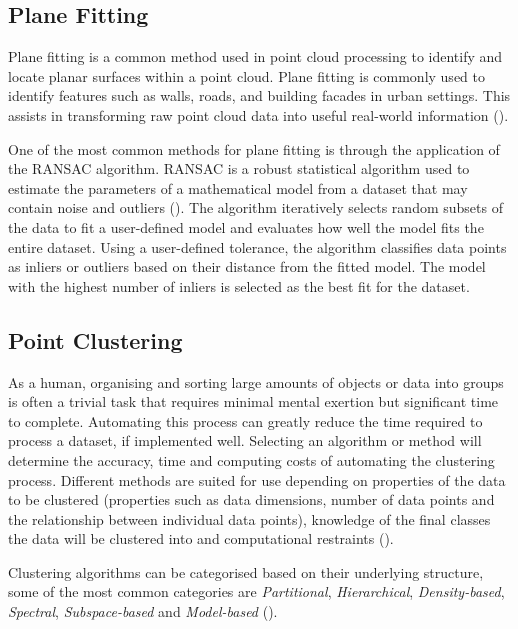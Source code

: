 \subsection{Plane Fitting}
\label{subsec:ch3.section3.subsec1}

Plane fitting is a common method used in point cloud processing to identify and locate planar surfaces within a point cloud. Plane fitting is commonly used to identify features such as walls, roads, and building facades in urban settings. This assists in transforming raw point cloud data into useful real-world information (\cite{lohaniAirborneLiDARTechnology2017}).

One of the most common methods for plane fitting is through the application of the \ac{RANSAC} algorithm. \ac{RANSAC} is a robust statistical algorithm used to estimate the parameters of a mathematical model from a dataset that may contain noise and outliers (\cite{fischlerRandomSampleConsensus1981}). The algorithm iteratively selects random subsets of the data to fit a user-defined model and evaluates how well the model fits the entire dataset. Using a user-defined tolerance, the algorithm classifies data points as inliers or outliers based on their distance from the fitted model. The model with the highest number of inliers is selected as the best fit for the dataset.

\subsection{Point Clustering}
\label{subsec:ch3.section3.subsec2}

As a human, organising and sorting large amounts of objects or data into groups is often a trivial task that requires minimal mental exertion but significant time to complete. Automating this process can greatly reduce the time required to process a dataset, if implemented well. Selecting an algorithm or method will determine the accuracy, time and computing costs of automating the clustering process. Different methods are suited for use depending on properties of the data to be clustered (properties such as data dimensions, number of data points and the relationship between individual data points), knowledge of the final classes the data will be clustered into and computational restraints (\cite{xuComprehensiveSurveyClustering2015}).

Clustering algorithms can be categorised based on their underlying structure, some of the most common categories are \emph{Partitional}, \emph{Hierarchical}, \emph{Density-based}, \emph{Spectral}, \emph{Subspace-based} and \emph{Model-based} (\cite{rodriguezClusteringAlgorithmsComparative2019}).

